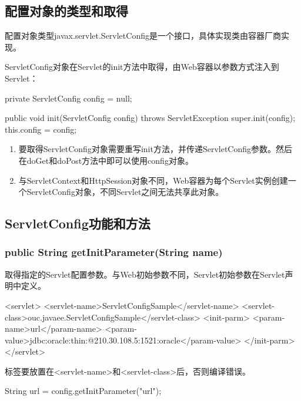\subsection{配置对象的类型和取得} 

配置对象类型javax.servlet.ServletConfig是一个接口，具体实现类由容器厂商实现。

ServletConfig对象在Servlet的init方法中取得，由Web容器以参数方式注入到Servlet：

\begin{javaCode}
  private ServletConfig config = null;

  public void init(ServletConfig config) throws ServletException {
    super.init(config);
    this.config = config;
  }
\end{javaCode}

\begin{enumerate}\kai
\item 要取得ServletConfig对象需要重写init方法，并传递ServletConfig参数。然后
  在doGet和doPost方法中即可以使用config对象。
\item 与ServletContext和HttpSession对象不同，Web容器为每个Servlet实例创建一
  个ServletConfig对象，不同Servlet之间无法共享此对象。
\end{enumerate}

\subsection{ServletConfig功能和方法} 

\subsubsection{public String getInitParameter(String name)} 

取得指定的Servlet配置参数。与Web初始参数不同，Servlet初始参数在Servlet声明中定义。

\begin{xmlCode}
  <servlet>  
  <servlet-name>ServletConfigSample</servlet-name>
  <servlet-class>ouc.javaee.ServletConfigSample</servlet-class>
  <init-parm>
  <param-name>url</param-name>
  <param-value>jdbc:oracle:thin:@210.30.108.5:1521:oracle</param-value>
  </init-parm>
  </servlet>  
\end{xmlCode}

 {标签要放置在<servlet-name>和<servlet-class>后，否则编译错误。}


\begin{javaCode}
  String url = config.getInitParameter("url");
\end{javaCode}

